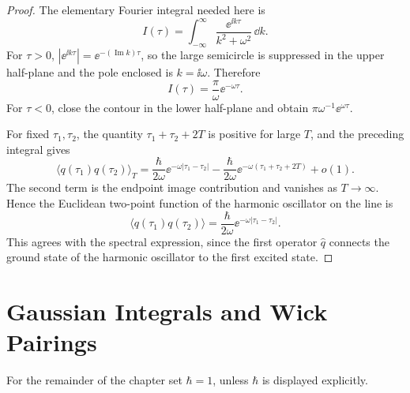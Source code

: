 \begin{proof}
The elementary Fourier integral needed here is
\[
  I(\tau)
  =
  \int_{-\infty}^{\infty}
  \frac{\ee^{\ii k\tau}}{k^2+\omega^2}\,\dd k .
\]
For \(\tau>0\), \(|\ee^{\ii k\tau}|=\ee^{-(\operatorname{Im}k)\tau}\), so the
large semicircle is suppressed in the upper half-plane and the pole enclosed
is \(k=\ii\omega\).  Therefore
\[
  I(\tau)
  =
  \frac{\pi}{\omega}\ee^{-\omega\tau}.
\]
For \(\tau<0\), close the contour in the lower half-plane and obtain
\(\pi\omega^{-1}\ee^{\omega\tau}\).

\begin{center}
\end{center}

For fixed \(\tau_1,\tau_2\), the quantity \(\tau_1+\tau_2+2T\) is positive for
large \(T\), and the preceding integral gives
\[
  \langle q(\tau_1)q(\tau_2)\rangle_T
  =
  \frac{\hbar}{2\omega}\ee^{-\omega|\tau_1-\tau_2|}
  -
  \frac{\hbar}{2\omega}\ee^{-\omega(\tau_1+\tau_2+2T)}
  +o(1).
\]
The second term is the endpoint image contribution and vanishes as
\(T\to\infty\).  Hence the Euclidean two-point function of the harmonic
oscillator on the line is
\[
  \boxed{
  \langle q(\tau_1)q(\tau_2)\rangle
  =
  \frac{\hbar}{2\omega}
  \ee^{-\omega|\tau_1-\tau_2|}
  }.
\]
This agrees with the spectral expression, since the first operator
\(\widehat q\) connects the ground state of the harmonic oscillator to the
first excited state.
\end{proof}

\section{Gaussian Integrals and Wick Pairings}

For the remainder of the chapter set \(\hbar=1\), unless \(\hbar\) is
displayed explicitly.


